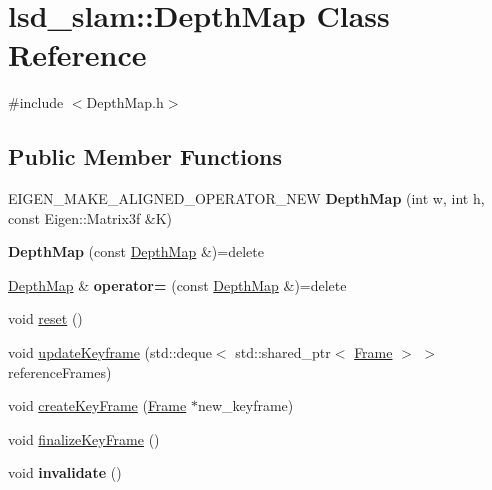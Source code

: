\hypertarget{classlsd__slam_1_1_depth_map}{\section{lsd\-\_\-slam\-:\-:Depth\-Map Class Reference}
\label{classlsd__slam_1_1_depth_map}
}


{\ttfamily \#include $<$Depth\-Map.\-h$>$}

\subsection*{Public Member Functions}
\begin{DoxyCompactItemize}
\item 
\hypertarget{classlsd__slam_1_1_depth_map_aa2135ac4d1e7a39b3033d880441f7834}{E\-I\-G\-E\-N\-\_\-\-M\-A\-K\-E\-\_\-\-A\-L\-I\-G\-N\-E\-D\-\_\-\-O\-P\-E\-R\-A\-T\-O\-R\-\_\-\-N\-E\-W {\bfseries Depth\-Map} (int w, int h, const Eigen\-::\-Matrix3f \&K)}\label{classlsd__slam_1_1_depth_map_aa2135ac4d1e7a39b3033d880441f7834}

\item 
\hypertarget{classlsd__slam_1_1_depth_map_a5a048281592f3b56a1a4c5b1753cbc58}{{\bfseries Depth\-Map} (const \hyperlink{classlsd__slam_1_1_depth_map}{Depth\-Map} \&)=delete}\label{classlsd__slam_1_1_depth_map_a5a048281592f3b56a1a4c5b1753cbc58}

\item 
\hypertarget{classlsd__slam_1_1_depth_map_a4f37b4a200ded170eebc41b61cab79f7}{\hyperlink{classlsd__slam_1_1_depth_map}{Depth\-Map} \& {\bfseries operator=} (const \hyperlink{classlsd__slam_1_1_depth_map}{Depth\-Map} \&)=delete}\label{classlsd__slam_1_1_depth_map_a4f37b4a200ded170eebc41b61cab79f7}

\item 
void \hyperlink{classlsd__slam_1_1_depth_map_ab8fc38eab2fd508e7fca49b58787b687}{reset} ()
\item 
void \hyperlink{classlsd__slam_1_1_depth_map_a80d89c896825d97dd61021ea8dc904eb}{update\-Keyframe} (std\-::deque$<$ std\-::shared\-\_\-ptr$<$ \hyperlink{classlsd__slam_1_1_frame}{Frame} $>$ $>$ reference\-Frames)
\item 
void \hyperlink{classlsd__slam_1_1_depth_map_add52a76d9e4ebdb9f14408bf3e996d8c}{create\-Key\-Frame} (\hyperlink{classlsd__slam_1_1_frame}{Frame} $\ast$new\-\_\-keyframe)
\item 
void \hyperlink{classlsd__slam_1_1_depth_map_a30d6435ab093553615696f68e3a157d8}{finalize\-Key\-Frame} ()
\item 
\hypertarget{classlsd__slam_1_1_depth_map_ac4fa06d232e9964882dd19cc44a31c3e}{void {\bfseries invalidate} ()}\label{classlsd__slam_1_1_depth_map_ac4fa06d232e9964882dd19cc44a31c3e}


\end{DoxyCompactItemize}
